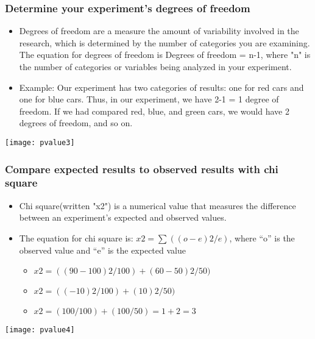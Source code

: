 \begin{frame}
\frametitle{Determine your experiment's degrees of freedom}
\begin{itemize}
\item Degrees of freedom are a measure the amount of variability involved in the research, which is determined by the number of categories you are examining. The equation for degrees of freedom is Degrees of freedom = n-1, where "n" is the number of categories or variables being analyzed in your experiment.
\item Example: Our experiment has two categories of results: one for red cars and one for blue cars. Thus, in our experiment, we have 2-1 = 1 degree of freedom. If we had compared red, blue, and green cars, we would have 2 degrees of freedom, and so on.
\end{itemize}

\begin{center}
\texttt{[image: pvalue3]}
\end{center}

\end{frame}

\begin{frame}
\frametitle{Compare expected results to observed results with chi square}
\begin{itemize}
\item Chi square(written "x2") is a numerical value that measures the difference between an experiment's expected and observed values. 
\item The equation for chi square is: $x2 = \sum((o-e)2/e)$, where ``o'' is the observed value and ``e'' is the expected value
\begin{itemize}
\item $x2 = ((90-100)2/100) + (60-50)2/50)$
\item $x2 = ((-10)2/100) + (10)2/50)$
\item $x2 = (100/100) + (100/50) = 1 + 2 = 3$
\end{itemize}

\end{itemize}

\begin{center}
\texttt{[image: pvalue4]}
\end{center}

\end{frame}

